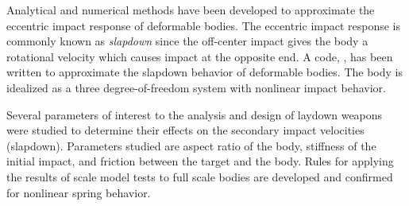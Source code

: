 Analytical and numerical methods have been developed to approximate
the eccentric impact response of deformable bodies.  The eccentric
impact response is commonly known as {\em slapdown} since the
off-center impact gives the body a rotational velocity which causes
impact at the opposite end.  A code, \SLAP , has been written to
approximate the slapdown behavior of deformable bodies. The body is
idealized as a three degree-of-freedom system with nonlinear impact
behavior. 

Several parameters of interest to the analysis and design of laydown
weapons were studied to determine their effects on the secondary
impact velocities (slapdown).  Parameters studied are aspect ratio of
the body, stiffness of the initial impact, and friction between the
target and the body. Rules for applying the results of scale model
tests to full scale bodies are developed and confirmed for nonlinear
spring behavior. 
